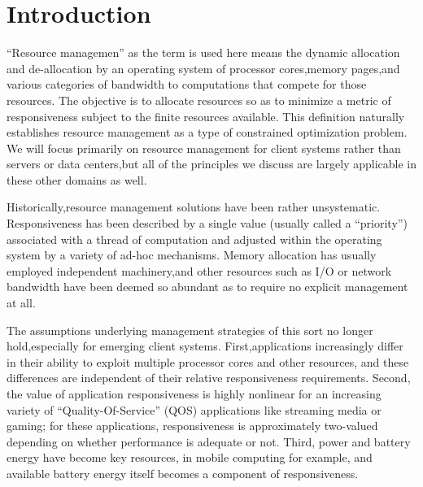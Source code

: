 \section{Introduction}

``Resource managemen'' as the term is used here means the dynamic allocation and de-allocation by an operating system of processor cores,memory pages,and various categories of  bandwidth to computations that compete for those resources.  The objective is to allocate resources so as to minimize a metric of responsiveness subject to the finite resources available.  This definition naturally establishes resource management as a type of constrained optimization problem.  We will focus primarily on resource management for client systems rather than servers or data centers,but all of the principles we discuss are largely applicable in these other domains as well.

Historically,resource management solutions have been rather unsystematic.  Responsiveness has been described by a single value (usually called a “priority”) associated with a thread of computation and adjusted within the operating system by a variety of ad-hoc mechanisms.  Memory allocation has usually employed independent machinery,and other resources such as I/O or network bandwidth have been deemed so abundant as to require no explicit management at all.

The assumptions underlying management strategies of this sort no longer hold,especially for emerging client systems.  First,applications increasingly differ in their ability to exploit multiple processor cores and other resources, and these differences are independent of their relative responsiveness requirements.  Second, the value of application responsiveness is highly nonlinear for an increasing variety of “Quality-Of-Service” (QOS) applications like streaming media or gaming; for these applications, responsiveness is approximately two-valued depending on whether performance is adequate or not.  Third, power and battery energy have become key resources, in mobile computing for example, and available battery energy itself becomes a component of responsiveness.
